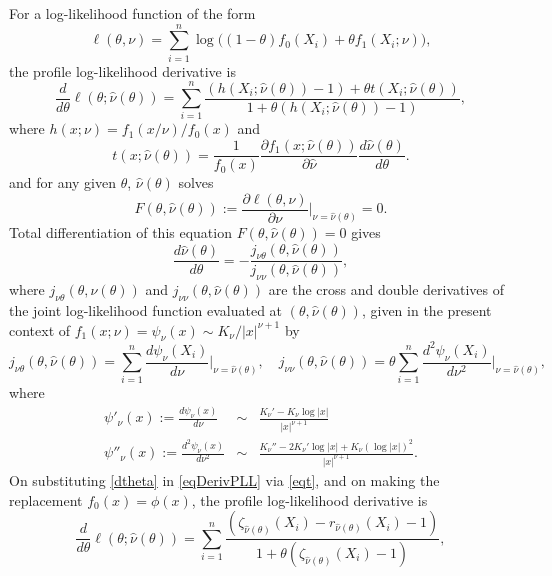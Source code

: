 \documentclass[11pt]{article}
\theoremstyle{definition}
\begin{document}
\begin{appendix}
	For a log-likelihood function of the form 
	\[
	\ell(\theta, \nu) = \sum_{i=1}^n \log\bigl((1-\theta)f_0(X_i) + \theta f_1(X_i; \nu)\bigr),
	\]
	the profile log-likelihood derivative is 
	\begin{equation}\label{eqDerivPLL}
	\frac{d}{d\theta}\ell(\theta; \hat\nu(\theta)) = \sum_{i=1}^n \frac{(h(X_i;\hat\nu(\theta))-1) + \theta t(X_i;\hat\nu(\theta))}{1+\theta(h(X_i;\hat\nu(\theta))-1)},
	\end{equation}
	where $h(x;\nu)=f_1(x/\nu)/f_0(x)$ and 
	\begin{equation}\label{eqt}
	t(x;\hat\nu(\theta))=\frac{1}{f_0(x)}\frac{\partial f_1(x;\hat\nu(\theta))}{\partial \hat\nu} \frac{d\hat\nu(\theta)}{d\theta}.
	\end{equation}
	and for any given $\theta$, $\hat\nu(\theta)$ solves 
	\[
	F(\theta,\hat\nu(\theta)):= \frac{\partial \ell(\theta,\nu)}{\partial \nu}\biggr|_{\nu=\hat\nu(\theta)} =0.
	\]
	Total differentiation of this equation $F(\theta,\hat\nu(\theta))=0$ gives
	\begin{equation}\label{dtheta}
	\frac{d\hat\nu(\theta)}{d\theta} = -\frac{j_{\nu\theta}(\theta,\hat\nu(\theta))}{j_{\nu\nu}(\theta,\hat\nu(\theta))},
	\end{equation}
	where $j_{\nu\theta}(\theta,\hat\nu(\theta))$ and $j_{\nu\nu}(\theta,\hat\nu(\theta))$ are the cross and double derivatives of the joint log-likelihood function evaluated at $(\theta,\hat\nu(\theta))$, given in the present context of $f_1(x;\nu)=\psi_\nu(x)\sim K_\nu/|x|^{\nu+1}$ by
	\[
	j_{\nu\theta}(\theta,\hat\nu(\theta)) = \sum_{i=1}^n \frac{d \psi_\nu (X_i)}{d\nu} \biggl|_{\nu=\hat\nu(\theta)}, \quad j_{\nu\nu}(\theta,\hat\nu(\theta)) = \theta \sum_{i=1}^n \frac{d^2 \psi_\nu (X_i)}{d\nu^2} \biggl|_{\nu=\hat\nu(\theta)},
	\]
	where
	\begin{eqnarray*}
		\psi'_\nu(x) :=	\frac{d \psi_\nu(x)}{d\nu}  &\sim & \frac{K_\nu' - K_\nu \log |x|}{|x|^{\nu+1}}\\
		\psi''_\nu(x) :=	\frac{d^2\psi_\nu(x)}{d\nu^2} &\sim & \frac{K_\nu'' - 2K_\nu'\log |x| + K_\nu(\log |x|)^2}{|x|^{\nu+1}}.
	\end{eqnarray*}
	On substituting \eqref{dtheta} in \eqref{eqDerivPLL} via \eqref{eqt}, and on making the replacement $f_0(x)=\phi(x)$, the profile log-likelihood derivative is
	\begin{equation}\label{eqProfileLLDeriv}
	\frac{d}{d\theta}\ell(\theta; \hat\nu(\theta)) 
	=\sum_{i=1}^{n}\frac{(\zeta_{\hat\nu(\theta)}(X_i) - r_{\hat{\nu}(\theta)}(X_i)-1)}{{1+\theta(\zeta_{\hat\nu(\theta)}(X_i)-1)}},

\end{equation}
\end{appendix}
\end{document}
